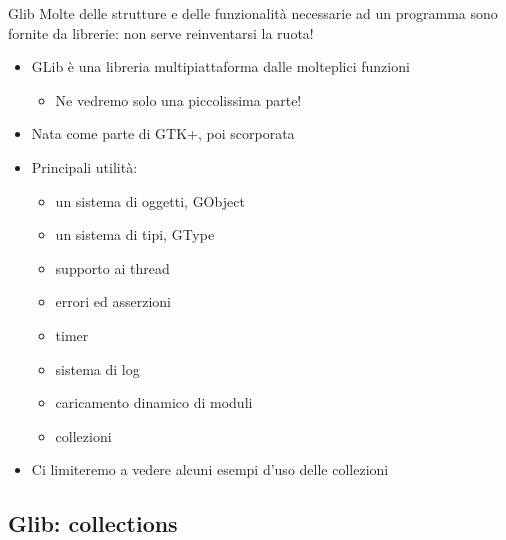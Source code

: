 \documentclass{beamer}
\begin{document}
\begin{frame}{Glib}
Molte delle strutture e delle funzionalità necessarie ad un programma sono fornite da librerie: non serve reinventarsi la ruota!
\begin{itemize}
 \item GLib è una libreria multipiattaforma dalle molteplici funzioni
  \begin{itemize}
    \item Ne vedremo solo una piccolissima parte!
  \end{itemize}
 \item Nata come parte di GTK+, poi scorporata
 \item Principali utilità:
  \begin{itemize}
    \item un sistema di oggetti, GObject
    \item un sistema di tipi, GType
    \item supporto ai thread
    \item errori ed asserzioni
    \item timer
    \item sistema di log
    \item caricamento dinamico di moduli
    \item collezioni
  \end{itemize}
 \item Ci limiteremo a vedere alcuni esempi d'uso delle collezioni
\end{itemize}
\end{frame}

\subsection{Glib: collections}
\end{document}

